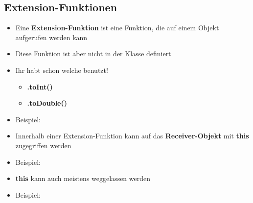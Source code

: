     \subsection{Extension-Funktionen}\label{subsec:extension-funktionen}
    \begin{frame}
        \slidehead
        \vspace{-1.5em}
        \begin{itemize}
            [<+->]
            \item Eine \textbf{Extension-Funktion} ist eine Funktion, die auf einem Objekt aufgerufen werden kann
            \item Diese Funktion ist aber nicht in der Klasse definiert
            \item Ihr habt schon welche benutzt!
            \begin{itemize}
                \item \textbf{.toInt()}
                \item \textbf{.toDouble()}
            \end{itemize}
            \item Beispiel: 
        \end{itemize}
    \end{frame}

    \begin{frame}
        \slidehead
        \vspace{-1.5em}
        \begin{itemize}
            [<+->]
            \item Innerhalb einer Extension-Funktion kann auf das \textbf{Receiver-Objekt} mit \textbf{this} zugegriffen werden
            \item Beispiel: 
            \item \textbf{this} kann auch meistens weggelassen werden
            \item Beispiel: 
        \end{itemize}
    \end{frame}


